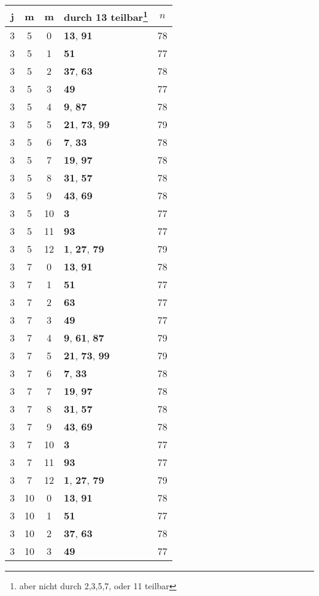 \documentclass{article}
\begin{document}
\begin{minipage}[t]{0.5\textwidth}
\vspace{0pt}
\begin{flushleft}
\begin{tabular}{||c|c|c|l|c||}
	j&m&m&durch 13 teilbar\footnote{aber nicht durch 2,3,5,7, oder 11 teilbar}&$n$\\
	\hline
	3&5&0&\textbf{13}, \textbf{91}&78\\
	3&5&1&\textbf{51}&77\\
	3&5&2&\textbf{37}, \textbf{63}&78\\
	3&5&3&\textbf{49}&77\\
	3&5&4&\textbf{9}, \textbf{87}&78\\
	3&5&5&\textbf{21}, \textbf{73}, \textbf{99}&79\\
	3&5&6&\textbf{7}, \textbf{33}&78\\
	3&5&7&\textbf{19}, \textbf{97}&78\\
	3&5&8&\textbf{31}, \textbf{57}&78\\
	3&5&9&\textbf{43}, \textbf{69}&78\\
	3&5&10&\textbf{3}&77\\
	3&5&11&\textbf{93}&77\\
	3&5&12&\textbf{1}, \textbf{27}, \textbf{79}&79\\
	3&7&0&\textbf{13}, \textbf{91}&78\\
	3&7&1&\textbf{51}&77\\
	3&7&2&\textbf{63}&77\\
	3&7&3&\textbf{49}&77\\
	3&7&4&\textbf{9}, \textbf{61}, \textbf{87}&79\\
	3&7&5&\textbf{21}, \textbf{73}, \textbf{99}&79\\
	3&7&6&\textbf{7}, \textbf{33}&78\\
	3&7&7&\textbf{19}, \textbf{97}&78\\
	3&7&8&\textbf{31}, \textbf{57}&78\\
	3&7&9&\textbf{43}, \textbf{69}&78\\
	3&7&10&\textbf{3}&77\\
	3&7&11&\textbf{93}&77\\
	3&7&12&\textbf{1}, \textbf{27}, \textbf{79}&79\\
	3&10&0&\textbf{13}, \textbf{91}&78\\
	3&10&1&\textbf{51}&77\\
	3&10&2&\textbf{37}, \textbf{63}&78\\
	3&10&3&\textbf{49}&77\\

\end{tabular}
\end{flushleft}
\end{minipage}
\end{document}
